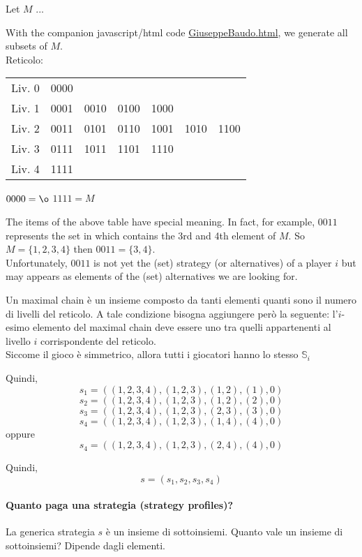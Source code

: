 \documentclass{article}
\begin{document}
Let $M$ ...

With the companion javascript/html code  \href{run:./GiuseppeBaudo.html}{GiuseppeBaudo.html}, we generate all subsets of $M$.\\

Reticolo: 

\begin{tabular}{c c c c c c c}
Liv. 0 & 0000 & & & & & \\ 

Liv. 1 & 0001 & 0010 & 0100 & 1000 & & \\ 

Liv. 2 & 0011 & 0101 & 0110 & 1001 & 1010 & 1100 \\ 

Liv. 3 & 0111 & 1011 & 1101 & 1110 & & \\ 

Liv. 4 & 1111 & & & & &
\end{tabular}

$0000 = \o$
$1111 = M$ 

The items of the above table have special meaning. In fact, for example, $0011$ represents the set in which contains the 3rd and 4th element of $M$. So $M=\{1,2,3,4\}$ then $0011 = \{3,4\}$. \\
Unfortunately, $0011$ is not yet the (set) strategy (or alternatives) of a player $i$ but may appears as elements of the (set) alternatives we are looking for.

Un maximal chain \`e un insieme composto da tanti elementi quanti sono il numero di livelli del reticolo. A tale condizione bisogna aggiungere per\`o la seguente: l'$i$-esimo elemento del maximal chain deve essere uno tra quelli appartenenti al livello $i$ corrispondente del reticolo.\\

Siccome il gioco \`e simmetrico, allora tutti i giocatori hanno lo stesso $\mathbb{S}_i$

Quindi,
\[ s_1 = ( (1,2,3,4), (1,2,3), (1,2), (1), 0  ) \]
\[ s_2 = ( (1,2,3,4), (1,2,3), (1,2), (2), 0  ) \]
\[ s_3 = ( (1,2,3,4), (1,2,3), (2,3), (3), 0  ) \]
\[ s_4 = ( (1,2,3,4), (1,2,3), (1,4), (4), 0  ) \] oppure \\
\[ s_4 = ( (1,2,3,4), (1,2,3), (2,4), (4), 0  ) \]

Quindi,
\[ s = (s_1, s_2, s_3, s_4) \] 

\paragraph{Quanto paga una strategia (strategy profiles)?}
La generica strategia $s$ \`e un insieme di sottoinsiemi. Quanto vale un insieme di sottoinsiemi? Dipende dagli elementi. 
\end{document}
